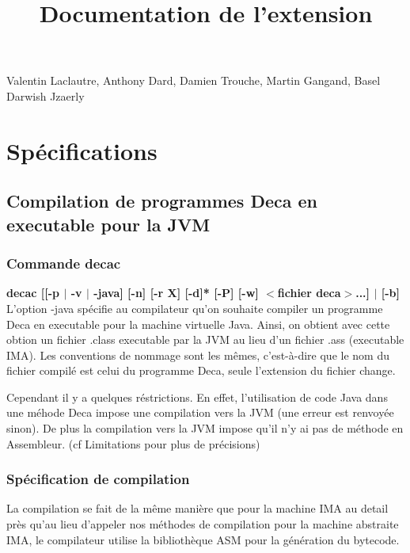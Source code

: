 \documentclass[12pt, a4paper, one side]{article}
\title{Documentation de l'extension}
\author{}
\date{}
\begin{document}
\maketitle

\begin{center}
    Valentin Laclautre, Anthony Dard, Damien Trouche, Martin Gangand, Basel Darwish Jzaerly
\end{center}

\tableofcontents

\section{Spécifications}
    \subsection{Compilation de programmes Deca en executable pour la JVM}
        \subsubsection{Commande decac}
        \textbf{decac [[-p $\mid$ -v $\mid$ -java] [-n] [-r X] [-d]* [-P] [-w] $<$fichier deca$>$...] $\mid$ [-b]}
        \\

        L'option -java spécifie au compilateur qu'on souhaite compiler un programme Deca en executable pour la machine virtuelle Java.
        Ainsi, on obtient avec cette obtion un fichier .class executable par la JVM au lieu d'un fichier .ass (executable IMA). Les conventions de nommage sont les mêmes, c'est-à-dire que le nom du fichier compilé est celui du programme Deca, seule l'extension du fichier change.

        Cependant il y a quelques réstrictions. En effet, l'utilisation de code Java dans une méhode Deca impose une compilation vers la JVM (une erreur est renvoyée sinon). De plus la compilation vers la JVM impose qu'il n'y ai pas de méthode en Assembleur. (cf Limitations pour plus de précisions)

        \subsubsection{Spécification de compilation}
        La compilation se fait de la même manière que pour la machine IMA au detail près qu'au lieu d'appeler nos méthodes de compilation pour la machine abstraite IMA, le compilateur utilise la bibliothèque ASM\cite{ASM} pour la génération du bytecode.
\end{document}
